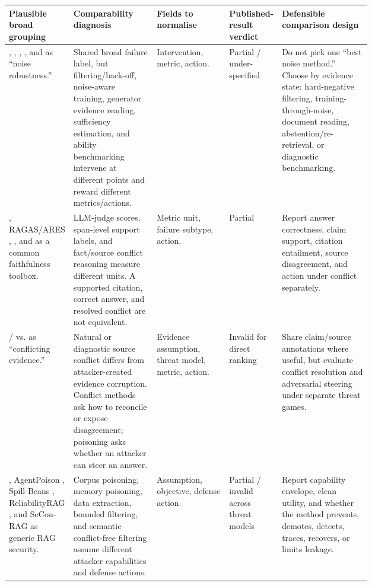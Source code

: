\begin{table}[t]
\centering
\scriptsize
\renewcommand{\arraystretch}{0.88}
\begin{tabularx}{\linewidth}{>{\raggedright\arraybackslash}p{0.16\linewidth}>{\raggedright\arraybackslash}p{0.23\linewidth}>{\raggedright\arraybackslash}p{0.20\linewidth}>{\raggedright\arraybackslash}p{0.12\linewidth}X}
\toprule
\textbf{Plausible broad grouping} & \textbf{Comparability diagnosis} & \textbf{Fields to normalise} & \textbf{Published-result verdict} & \textbf{Defensible comparison design} \\
\midrule
\citet{irrelevantContext2023}, \citet{raat2024}, \citet{chainOfNote2023}, \citet{sufficientContext2024}, and \citet{rgb2023} as ``noise robustness.'' & Shared broad failure label, but filtering/back-off, noise-aware training, generator evidence reading, sufficiency estimation, and ability benchmarking intervene at different points and reward different metrics/actions. & Intervention, metric, action. & Partial / under-specified & Do not pick one ``best noise method.'' Choose by evidence state: hard-negative filtering, training-through-noise, document reading, abstention/re-retrieval, or diagnostic benchmarking. \\
\citet{ragTruth2024}, RAGAS/ARES \citep{ragas2024,ares2024}, \citet{faithfulRAG2025}, and \citet{astuteRAG2025} as a common faithfulness toolbox. & LLM-judge scores, span-level support labels, and fact/source conflict reasoning measure different units. A supported citation, correct answer, and resolved conflict are not equivalent. & Metric unit, failure subtype, action. & Partial & Report answer correctness, claim support, citation entailment, source disagreement, and action under conflict separately. \\
\citet{faithfulRAG2025} / \citet{astuteRAG2025} vs. \citet{poisonedRAG2024} as ``conflicting evidence.'' & Natural or diagnostic source conflict differs from attacker-created evidence corruption. Conflict methods ask how to reconcile or expose disagreement; poisoning asks whether an attacker can steer an answer. & Evidence assumption, threat model, metric, action. & Invalid for direct ranking & Share claim/source annotations where useful, but evaluate conflict resolution and adversarial steering under separate threat games. \\
\citet{poisonedRAG2024}, AgentPoison \citep{rrag053}, Spill-Beans \citep{venue200SpillBeans}, ReliabilityRAG \citep{rrag021}, and SeCon-RAG \citep{rrag017} as generic RAG security. & Corpus poisoning, memory poisoning, data extraction, bounded filtering, and semantic conflict-free filtering assume different attacker capabilities and defense actions. & Assumption, objective, defense action. & Partial / invalid across threat models & Report capability envelope, clean utility, and whether the method prevents, demotes, detects, traces, recovers, or limits leakage. \\

\end{tabularx}
\end{table}
